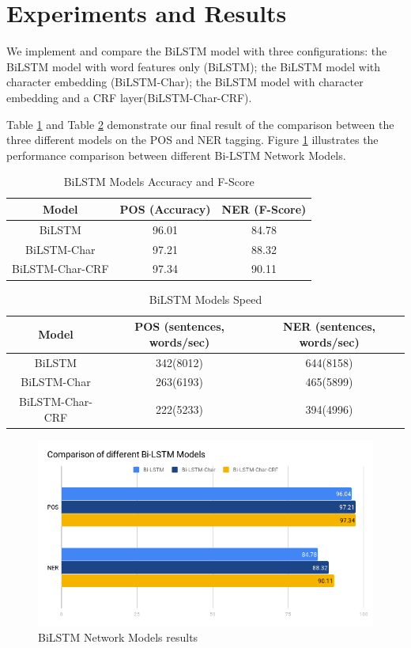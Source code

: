 \documentclass{sfuthesis}
\begin{document}
 
\section{Experiments and Results}

We implement and compare the BiLSTM model with three configurations: the BiLSTM model with word features only (BiLSTM); the BiLSTM model with character embedding (BiLSTM-Char); the BiLSTM model with character embedding and a CRF layer(BiLSTM-Char-CRF).

Table \ref{table:lstm-table1} and Table \ref{table:lstm-table2} demonstrate our final result of the comparison between the three different models on the POS and NER tagging. Figure \ref{fig:lstm} illustrates the performance comparison between different Bi-LSTM Network Models.

\begin{table}[]
\centering
\caption{BiLSTM Models Accuracy and F-Score}
\label{table:lstm-table1}
\begin{tabular}{|c|c|c|}
\hline
Model         & POS (Accuracy)  & NER (F-Score)       \\ \hline
BiLSTM  & 96.01     & 84.78                             \\ \hline
BiLSTM-Char & 97.21 & 88.32             \\ \hline
BiLSTM-Char-CRF & 97.34  & 90.11             \\ \hline
\end{tabular}
\end{table}

\begin{table}[]
\centering
\caption{BiLSTM Models Speed}
\label{table:lstm-table2}
\begin{tabular}{|c|c|c|}
\hline
Model       & POS  (sentences, words/sec)  & NER  (sentences, words/sec)      \\ \hline
BiLSTM             & 342(8012)     & 644(8158)       \\ \hline
BiLSTM-Char        & 263(6193)  & 465(5899)             \\ \hline
BiLSTM-Char-CRF    & 222(5233)  & 394(4996)         \\ \hline
\end{tabular}
\end{table}

\begin{figure}
  \centering
  \includegraphics[scale=0.6]{lstm.png}
 \caption{BiLSTM Network Models results}
  \label{fig:lstm}
\end{figure}
\end{document}
